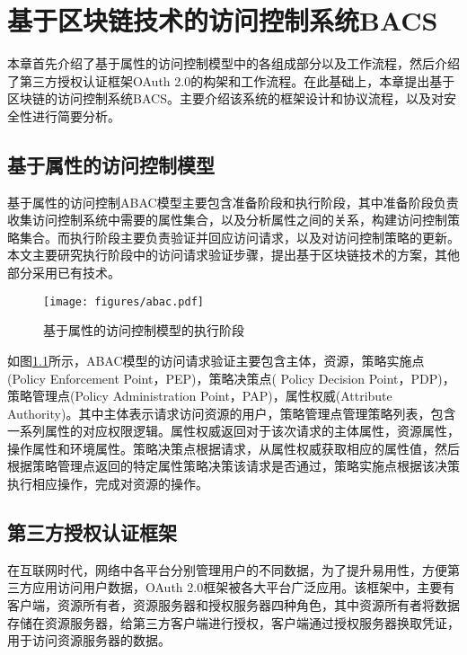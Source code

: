 
\chapter{基于区块链技术的访问控制系统BACS}
\label{chap:bacs}

本章首先介绍了基于属性的访问控制模型中的各组成部分以及工作流程，然后介绍了第三方授权认证框架OAuth 2.0的构架和工作流程。在此基础上，本章提出基于区块链的访问控制系统BACS。主要介绍该系统的框架设计和协议流程，以及对安全性进行简要分析。

\section{基于属性的访问控制模型}

基于属性的访问控制ABAC模型主要包含准备阶段和执行阶段，其中准备阶段负责收集访问控制系统中需要的属性集合，以及分析属性之间的关系，构建访问控制策略集合。而执行阶段主要负责验证并回应访问请求，以及对访问控制策略的更新。本文主要研究执行阶段中的访问请求验证步骤，提出基于区块链技术的方案，其他部分采用已有技术。

\begin{figure}[H]
\centering
\texttt{[image: figures/abac.pdf]}
\caption{基于属性的访问控制模型的执行阶段}
\label{fig:abac}
\end{figure}

如图\ref{fig:abac}所示，ABAC模型的访问请求验证主要包含主体，资源，策略实施点(Policy Enforcement Point，PEP)，策略决策点( Policy Decision Point，PDP)，策略管理点(Policy Administration Point，PAP)，属性权威(Attribute Authority)。其中主体表示请求访问资源的用户，策略管理点管理策略列表，包含一系列属性的对应权限逻辑。属性权威返回对于该次请求的主体属性，资源属性，操作属性和环境属性。策略决策点根据请求，从属性权威获取相应的属性值，然后根据策略管理点返回的特定属性策略决策该请求是否通过，策略实施点根据该决策执行相应操作，完成对资源的操作。

\section{第三方授权认证框架}

在互联网时代，网络中各平台分别管理用户的不同数据，为了提升易用性，方便第三方应用访问用户数据，OAuth 2.0框架被各大平台广泛应用。该框架中，主要有客户端，资源所有者，资源服务器和授权服务器四种角色，其中资源所有者将数据存储在资源服务器，给第三方客户端进行授权，客户端通过授权服务器换取凭证，用于访问资源服务器的数据。

